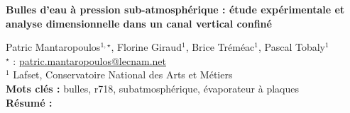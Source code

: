 


    \newpage


%
\begin{flushleft}
\addtocounter{section}{1}
{\Large \textbf{Bulles d'eau à pression sub-atmosphérique : étude expérimentale et analyse dimensionnelle dans un canal vertical confiné}}\label{ref:57}
\end{flushleft}
%
Patric Mantaropoulos$^{1,\star}$, Florine Giraud$^{1}$, Brice Tréméac$^{1}$, Pascal Tobaly$^{1}$\\[2mm]
$^{\star}$ \Letter : \url{patric.mantaropoulos@lecnam.net}\\[2mm]
{\footnotesize $^{1}$ Lafset, Conservatoire National des Arts et Métiers}\\
[4mm]
%
\noindent \textbf{Mots clés : } bulles, r718, subatmosphérique, évaporateur à plaques\\[4mm]
%
\noindent \textbf{Résumé : } 

